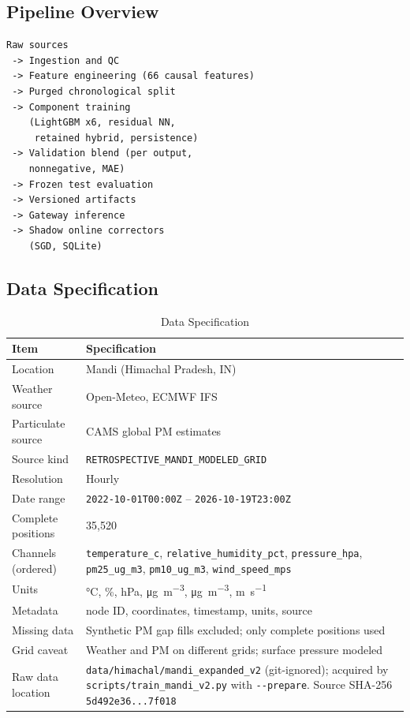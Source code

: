\documentclass[journal,a4paper]{IEEEtran}
\begin{document}
\subsection{Pipeline Overview}

\begin{lstlisting}
Raw sources
 -> Ingestion and QC
 -> Feature engineering (66 causal features)
 -> Purged chronological split
 -> Component training
    (LightGBM x6, residual NN,
     retained hybrid, persistence)
 -> Validation blend (per output,
    nonnegative, MAE)
 -> Frozen test evaluation
 -> Versioned artifacts
 -> Gateway inference
 -> Shadow online correctors
    (SGD, SQLite)
\end{lstlisting}

\subsection{Data Specification}

\begin{table}[!htbp]
\caption{Data Specification}
\label{tab:data}
\centering
\footnotesize
\begin{tabular}{@{}p{0.88in}p{2.25in}@{}}
\toprule
Item & Specification \\
\midrule
Location & Mandi (Himachal Pradesh, IN) \\
Weather source & Open-Meteo, ECMWF IFS \\
Particulate source & CAMS global PM estimates \\
Source kind & \texttt{RETROSPECTIVE\_MANDI\_MODELED\_GRID} \\
Resolution & Hourly \\
Date range & \texttt{2022-10-01T00:00Z} -- \texttt{2026-10-19T23:00Z} \\
Complete positions & 35{,}520 \\
Channels (ordered) & \texttt{temperature\_c}, \texttt{relative\_humidity\_pct}, \texttt{pressure\_hpa}, \texttt{pm25\_ug\_m3}, \texttt{pm10\_ug\_m3}, \texttt{wind\_speed\_mps} \\
Units & \si{\celsius}, \si{\percent}, \si{hPa}, \si{\micro\gram\per\cubic\metre}, \si{\micro\gram\per\cubic\metre}, \si{\metre\per\second} \\
Metadata & node ID, coordinates, timestamp, units, source \\
Missing data & Synthetic PM gap fills excluded; only complete positions used \\
Grid caveat & Weather and PM on different grids; surface pressure modeled \\
Raw data location & \nolinkurl{data/himachal/mandi_expanded_v2} (git-ignored); acquired by \nolinkurl{scripts/train_mandi_v2.py} with \texttt{-{}-prepare}. Source SHA-256 \texttt{5d492e36...7f018} \\
\bottomrule
\end{tabular}
\end{table}
\end{document}
